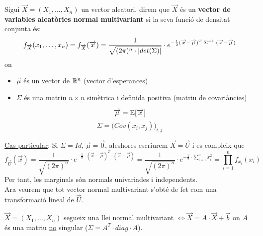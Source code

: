 \begin{defi}
  Sigui $\overrightarrow{X}=(X_{1},\ldots,X_{n})$ un vector aleatori, direm que $\overrightarrow{X}$ és un \textbf{vector de variables aleatòries normal multivariant} si la seva funció de densitat conjunta és:
  \[
    f_{\overrightarrow{X}}(x_{1},\ldots,x_{n}) = f_{\overrightarrow{X}}(\overrightarrow{x}) = \frac{1}{\sqrt{(2\pi)^{n}\cdot \left\vert det(\Sigma) \right\vert}}\cdot e^{-\frac{1}{2}(\overrightarrow{x}-\overrightarrow{\mu})^{T}\cdot \Sigma^{-1} \cdot (\overrightarrow{x}-\overrightarrow{\mu})}
  \]
  on
  \begin{itemize}
      \item  $\overrightarrow{\mu}$ és un vector de $\mathbb{R}^{n}$ (vector d'esperances)
      \item $\Sigma$ és una matriu $n\times n$ simètrica i definida positiva (matriu de covariàncies)
  \end{itemize}
  \[
    \overrightarrow{\mu} = \mathbb{E}[\overrightarrow{x}]
  \]
  \[
    \Sigma = \Big( Cov(x_{i},x_{j})\Big)_{i,j}
  \]
\end{defi}

\underline{Cas particular}: Si $\Sigma = Id$, $\overrightarrow{\mu} = \overrightarrow{0}$, aleshores escriurem $\overrightarrow{X}=\overrightarrow{U}$ i es compleix que 
\[
f_{\overrightarrow{U}}(\overrightarrow{x}) = \frac{1}{\sqrt{(2\pi)^{n}}}\cdot e^{-\frac{1}{2}\cdot(\overrightarrow{x}-\overrightarrow{\mu})^{T}\cdot  (\overrightarrow{x}-\overrightarrow{\mu})} = \frac{1}{\sqrt{(2\pi)^{n}}}\cdot e^{-\frac{1}{2}\cdot\sum\limits_{i=1}^{n}x_{i}^{2}} = \prod_{i=1}^{n} f_{x_{i}}(x_{i})
\]
Per tant, les marginals són normals univariades i independents. \\

Ara veurem que tot vector normal multivariant s'obté de fet com una transformació lineal de $\overrightarrow{U}$.

\begin{thm}
  $\overrightarrow{X}=(X_{1},\ldots,X_{n})$ segueix una llei normal multivariant $\iff \overrightarrow{X} = A\cdot\overrightarrow{X} + \overrightarrow{b}$ on $A$ és una matriu \underline{no} singular ($\Sigma = A^{T}\cdot diag \cdot A$).
\end{thm}
